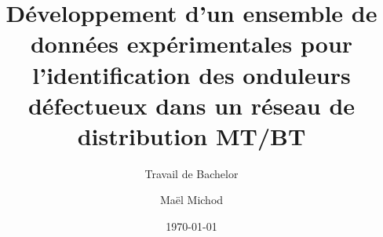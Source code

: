 \author{Maël Michod}


\title{Développement d'un ensemble de données expérimentales pour l'identification des onduleurs défectueux dans un réseau de distribution MT/BT}

\subtitle{Travail de Bachelor}


\date{\today}

\thesis{-}

